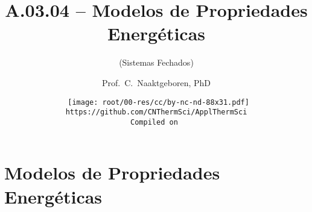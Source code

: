\makeatletter
\immediate{} %
\makeatother



\title{A.03.04 -- Modelos de Propriedades Energéticas}
\subtitle{(Sistemas Fechados)}
\author{Prof.~C.~Naaktgeboren, PhD}
\date{{\scriptsize\tt%
    \texttt{[image: root/00-res/cc/by-nc-nd-88x31.pdf]}\\[\smallskipamount]
    https://github.com/CNThermSci/ApplThermSci\\
    Compiled on 
}}

\frame{\titlepage}

\frame{\tableofcontents}

\section{Modelos de Propriedades Energéticas}

